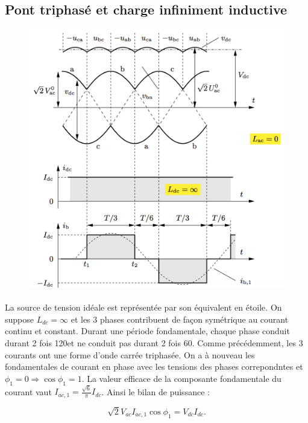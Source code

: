 	\subsection{Pont triphasé et charge infiniment inductive}
		\begin{figure}
		\vspace{-5mm}
		\includegraphics[scale=0.3]{ch2/11}
		\end{figure} 
		La source de tension idéale est représentée par son équivalent en étoile. On suppose $L_{dc} = \infty$ et les 3  phases contribuent de façon symétrique au courant continu et constant. Durant une période fondamentale, chaque phase conduit durant 2 fois 120\degres et ne conduit pas durant 2 fois 60\degres . Comme précédemment, les 3 courants ont une forme d'onde carrée triphasée. On a à nouveau les  fondamentales de courant en phase avec les tensions des phases correpondntes et $\phi _1 = 0 \Rightarrow \cos \phi _1 = 1$. La valeur efficace de la composante fondamentale du courant vaut $I_{ac,1} = \frac{\sqrt{6}}{\pi}I_{dc}$. Ainsi le bilan de puissance :

		\begin{equation}
			\sqrt{2}V_{ac}I_{ac,1} \cos \phi _1= V_{dc}I_{dc}. 
		\end{equation}
		
